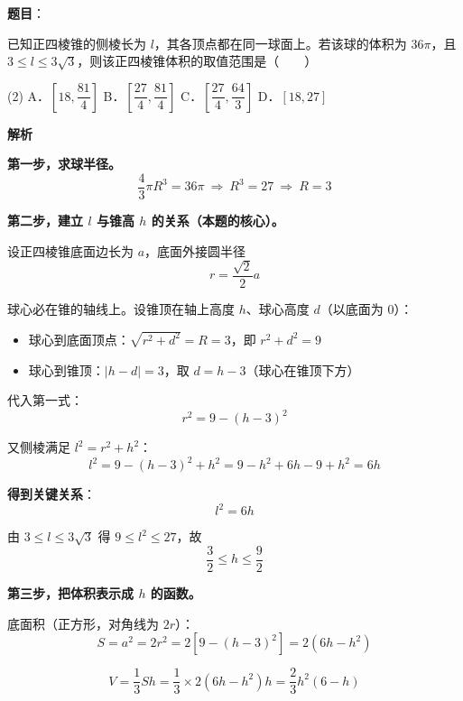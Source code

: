 \begin{answer}

\textbf{题目}：

已知正四棱锥的侧棱长为 $l$，其各顶点都在同一球面上。若该球的体积为 $36\pi$，且 $3\le l\le3\sqrt3$，则该正四棱锥体积的取值范围是\mbox{（　　）}

\begin{gkopts}(2)
\task A．$\left[18,\dfrac{81}4\right]$
\task B．$\left[\dfrac{27}4,\dfrac{81}4\right]$
\task C．$\left[\dfrac{27}4,\dfrac{64}3\right]$
\task D．$[18,27]$
\end{gkopts}

\textbf{解析}

\textbf{第一步，求球半径。}
\nopagebreak[4]
\[\frac43\pi R^{3}=36\pi\ \Longrightarrow\ R^{3}=27\ \Longrightarrow\ R=3\]

\textbf{第二步，建立 $l$ 与锥高 $h$ 的关系（本题的核心）。}

设正四棱锥底面边长为 $a$，底面外接圆半径
\nopagebreak[4]
\[r=\frac{\sqrt2}2a\]

球心必在锥的轴线上。设锥顶在轴上高度 $h$、球心高度 $d$（以底面为 $0$）：

\begin{itemize}
\item 球心到底面顶点：$\sqrt{r^{2}+d^{2}}=R=3$，即 $r^{2}+d^{2}=9$
\item 球心到锥顶：$|h-d|=3$，取 $d=h-3$（球心在锥顶下方）
\end{itemize}

代入第一式：
\nopagebreak[4]
\[r^{2}=9-(h-3)^{2}\]

又侧棱满足 $l^{2}=r^{2}+h^{2}$：
\nopagebreak[4]
\[l^{2}=9-(h-3)^{2}+h^{2}=9-h^{2}+6h-9+h^{2}=6h\]

\textbf{得到关键关系}：
\nopagebreak[4]
\[\boxed{l^{2}=6h}\]

由 $3\le l\le3\sqrt3$ 得 $9\le l^{2}\le27$，故
\nopagebreak[4]
\[\frac32\le h\le\frac92\]

\textbf{第三步，把体积表示成 $h$ 的函数。}

底面积（正方形，对角线为 $2r$）：
\nopagebreak[4]
\[S=a^{2}=2r^{2}=2\left[9-(h-3)^{2}\right]=2\left(6h-h^{2}\right)\]

\nopagebreak[4]
\[V=\frac13Sh=\frac13\times2\left(6h-h^{2}\right)h=\frac23h^{2}(6-h)\]


\end{answer}
